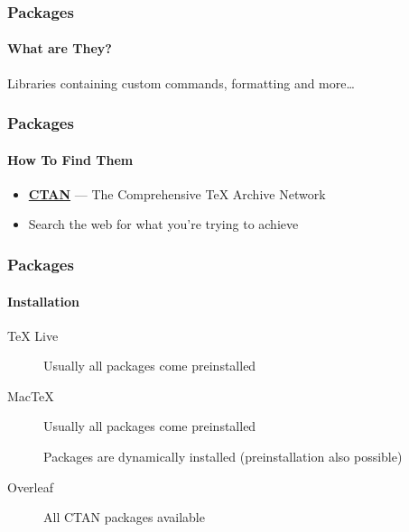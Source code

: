 \begin{frame}
    \frametitle{Packages}
    \framesubtitle{What are They?}
    \begin{center}
        Libraries containing custom commands, formatting and more\ldots
    \end{center}
\end{frame}
\begin{frame}
    \frametitle{Packages}
    \framesubtitle{How To Find Them}
    \begin{itemize}
        \item<+-> \href{https://ctan.org/}{\textbf{CTAN}} --- The Comprehensive \TeX{} Archive Network\\
        \item<+-> Search the web for what you're trying to achieve
    \end{itemize}
\end{frame}
\begin{frame}
    \frametitle{Packages}
    \framesubtitle{Installation}
    \begin{description}
        \item[\TeX{} Live] Usually all packages come preinstalled
        \item[Mac\TeX{}] Usually all packages come preinstalled
        \item[] Packages are dynamically installed (preinstallation also possible)
        \item[Overleaf] All CTAN packages available
    \end{description}
\end{frame}